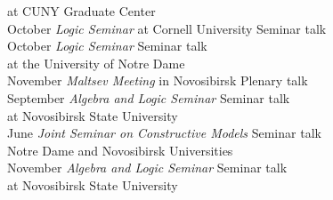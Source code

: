 \documentclass[12pt]{article}
\begin{document}
\begin{tabbing}
{		\>	\> at CUNY Graduate Center			\> \\
October			\> {\em Logic Seminar} at Cornell University	\> Seminar talk\\
October			\> {\em Logic Seminar}				\> Seminar talk\\
		\>	\> at the University of Notre Dame		\> \\
November		\> {\em Maltsev Meeting} in Novosibirsk		\> Plenary talk\\
September		\> {\em Algebra and Logic Seminar}		\> Seminar talk\\
		\>	\> at Novosibirsk State University		\> \\
June			\> {\em Joint Seminar on Constructive Models}	\> Seminar talk\\
		\>	\> Notre Dame and Novosibirsk Universities	\> \\
November		\> {\em Algebra and Logic Seminar}		\> Seminar talk\\
		\>	\> at Novosibirsk State University		\>
}{}
\end{tabbing}
\end{document}
